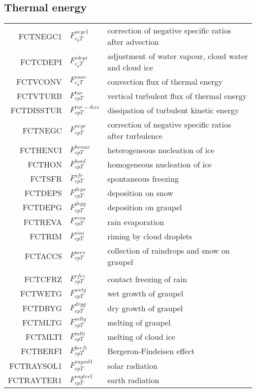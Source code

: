   \subsection{Thermal energy}
  \begin{tabular}{rll}

       FCTNEGC1     &$F_{c_p T}^{negc1}$ &correction of negative specific ratios after advection\\
       FCTCDEPI     &$F_{c_p T}^{cdepi}$ &adjustment of water vapour, cloud water and cloud ice\\
       FCTVCONV     &$F_{c_p T}^{conv}$ &convection flux of thermal energy\\
       FCTVTURB     &$F_{cp T}^{tur}$ &vertical turbulent flux of thermal energy\\
       FCTDISSTUR   &$F_{cp T}^{tur-diss}$  &dissipation of turbulent kinetic energy\\         
       FCTNEGC      &$F_{cp T}^{negc}$ &correction of negative specific ratios after turbulence\\
       FCTHENUI     &$F_{cp T}^{henuv}$ &heterogeneous nucleation of ice\\       
       FCTHON       &$F_{cp T}^{honl}$ &homogeneous nucleation of ice\\
       FCTSFR       &$F_{cp T}^{sfr}$ &spontaneous freezing\\     
       FCTDEPS      &$F_{cp T}^{deps}$ &deposition on snow\\      
       FCTDEPG      &$F_{cp T}^{depg}$ &deposition on graupel\\      
       FCTREVA      &$F_{cp T}^{reva}$ &rain evaporation\\
       FCTRIM       &$F_{cp T}^{rim}$  &riming by cloud droplets\\     
       FCTACCS      &$F_{cp T}^{accs}$  &collection of raindrops and snow on graupel\\\\      
       FCTCFRZ      &$F_{cp T}^{cfrz}$ &contact freezing of rain\\      
       FCTWETG      &$F_{cp T}^{wetg}$ &wet growth of graupel\\      
       FCTDRYG      &$F_{cp T}^{dryg}$ &dry growth of graupel\\
       FCTMLTG      &$F_{cp T}^{mltg}$ &melting of graupel\\
       FCTMLTI      &$F_{cp T}^{mlti}$ &melting of cloud ice\\
       FCTBERFI     &$F_{cp T}^{berfi}$ &Bergeron-Findeisen effect\\
       FCTRAYSOL1   &$F_{cp T}^{raysol1}$ &solar radiation\\
       FCTRAYTER1   &$F_{cp T}^{rayter1}$ &earth radiation\\
  \end{tabular}

